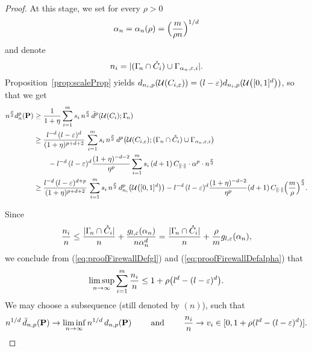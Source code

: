 \begin{proof}
At this stage, we set for every $\rho > 0$
\begin{equation}\label{eq:proofFirewallDefalpha}
\alpha_n=\alpha_n(\rho) = \Bigl( \frac{m}{\rho n} \Bigr)^{1/d}
\end{equation}
and denote
\[
	n_i = \lvert(\Gamma_{\!n}\cap\mathring C_i)\cup \Gamma_{\alpha_n, \varepsilon, i}\rvert.
\]
Proposition~\ref{prop:scaleProp} yields $d_{n_i,p}(\mathcal{U}(C_{i,\varepsilon})) =
(l-\varepsilon) d_{n_i,p}(\mathcal{U}\bigl([0,1]^d\bigr)) $, so that we get 
\begin{equation}\label{eq:proofRateCubewiseb}
  \begin{split}
      n^{\frac pd}d_{n}^p(\Probb) & \geq \frac{1}{1+\eta} \sum_{i=1}^m s_i\,
      n^{\frac pd}\,\dqbp(\U(C_i);\Gamman)\\
      & \geq \frac{l^{-d }\,(l-\varepsilon)^d}{(1+\eta)^{p+d+2}}\, \sum_{i=1}^m s_i\, n^{\frac pd}\, \dqp\bigl(\U(\Cie);
  (\Gamma_n\cap\mathring C_i)\cup \gaei\bigr) \\
  & \qquad -  l^{-d}\,(l-\varepsilon)^d
  \frac{(1+\eta)^{-d-2}}{\eta^p} \sum_{i=1}^m
  s_i\, (d+1)\, C_{\norm{\cdot}}\cdot\alpha^p \cdot
  n^{\frac pd} \\
  &\geq \frac{l^{-d }\,(l-\varepsilon)^{d+p}}{(1+\eta)^{p+d+2}}\, \sum_{i=1}^m s_i\,
      n^{\frac pd}\, \dqpnn{n_i}\bigl(\Unifd\bigr) 
  -  l^{-d}\,(l-\varepsilon)^d
  \frac{(1+\eta)^{-d-2}}{\eta^p}  (d+1)\,
       C_{\norm{\cdot}} 
  \Bigl(\frac{m}{\rho}\Bigr)^{\frac pd}.
  \end{split}
\end{equation}

Since
\[
\frac{n_i}{n} \leq \frac{\lvert\Gamma_{\!n}\cap\mathring C_i\rvert}{n} +
\frac{g_{l,\varepsilon}(\alpha_n)}{n\alpha_n^d} = \frac{\lvert\Gamma_{\!n}\cap\mathring
C_i\rvert}{n} + \frac{\rho}{m} g_{l,\varepsilon}(\alpha_n),
\]
we conclude from (\ref{eq:proofFirewallDefgl}) and (\ref{eq:proofFirewallDefalpha}) that
\[
	\limsup_{n\to\infty}\sum_{i=1}^m \frac{n_i}{n} \leq 1 + \rho \bigl(l^d -
	(l-\varepsilon)^d\bigr).
\]
We may choose a subsequence (still denoted by $(n)$), such that
\[
n^{1/d}\, \bar
d_{n,p}(\mathbf{P}) \to \liminf_{n\to\infty} n^{1/d}\, d_{n,p}(\mathbf{P})
 \qquad\text{ and }\qquad 
\frac{n_i}{n} \to v_i \in [0,1 + \rho (l^d -
	(l-\varepsilon)^d)].
\]


\end{proof}
